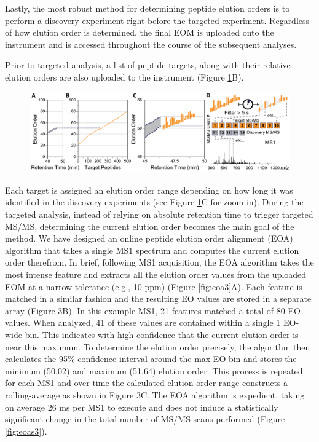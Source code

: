 Lastly, the most robust method for determining peptide elution orders is to perform a discovery experiment right before the targeted experiment. Regardless of how elution order is determined, the final EOM is uploaded onto the instrument and is accessed throughout the course of the subsequent analyses.

Prior to targeted analysis, a list of peptide targets, along with their relative elution orders are also uploaded to the instrument (Figure \ref{fig:eoa4}B).
\begin{figure}
	\centering
	\includegraphics[width=\columnwidth]{eoa/EOA 4.png}
	\label{fig:eoa4}
\end{figure} 
Each target is assigned an elution order range depending on how long it was identified in the discovery experiments (see Figure \ref{fig:eoa4}C for zoom in). During the targeted analysis, instead of relying on absolute retention time to trigger targeted MS/MS, determining the current elution order becomes the main goal of the method. We have designed an online peptide elution order alignment (EOA) algorithm that takes a single MS1 spectrum and computes the current elution order therefrom. In brief, following MS1 acquisition, the EOA algorithm takes the most intense \mz{} feature and extracts all the elution order values from the uploaded EOM at a narrow \mz{} tolerance (e.g., 10 ppm) (Figure \ref{fig:eoa3}A). Each \mz{} feature is matched in a similar fashion and the resulting EO values are stored in a separate array (Figure 3B). In this example MS1, 21 \mz{} features matched a total of 80 EO values. When analyzed, 41 of these values are contained within a single 1 EO-wide bin. This indicates with high confidence that the current elution order is near this maximum. To determine the elution order precisely, the algorithm then calculates the 95\% confidence interval around the max EO bin and stores the minimum (50.02) and maximum (51.64) elution order. This process is repeated for each MS1 and over time the calculated elution order range constructs a rolling-average as shown in Figure 3C. The EOA algorithm is expedient, taking on average 26 ms per MS1 to execute and does not induce a statistically significant change in the total number of MS/MS scans performed (Figure \ref{fig:eoas3}).
